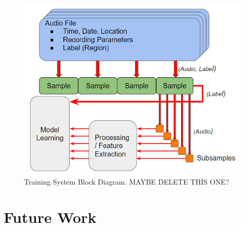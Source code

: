 \documentclass[journal]{IEEEtran}
\begin{document}
\begin{figure}[H]
\centering
\includegraphics[width=0.9\linewidth]{train_flow}
\caption{Training System Block Diagram. MAYBE DELETE THIS ONE?}
\label{fig:training_bd}
\end{figure}


\section{Future Work}


%
%
%


\raggedbottom
\end{document}
